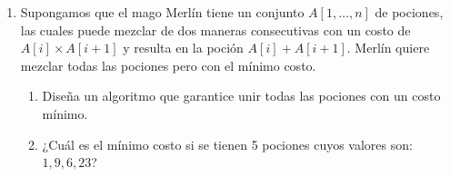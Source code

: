 \documentclass[letterpaper,11pt]{article}
\begin{document}
\begin{enumerate}
    \item Supongamos que el mago Merlín tiene un conjunto $A[1, \ldots, n]$ de 
    pociones, las cuales puede mezclar de dos maneras consecutivas con un costo 
    de $A[i] \times A[i + 1]$ y resulta en la poción $A[i] + A[i+1]$. Merlín 
    quiere mezclar todas las pociones pero con el mínimo costo.
    \begin{enumerate}
        \item Diseña un algoritmo que garantice unir todas las pociones con 
        un costo mínimo.
        
        \item ¿Cuál es el mínimo costo si se tienen 5 pociones cuyos valores son:
        $1, 9, 6, 2 3$?
    \end{enumerate}

\end{enumerate}
\end{document}
